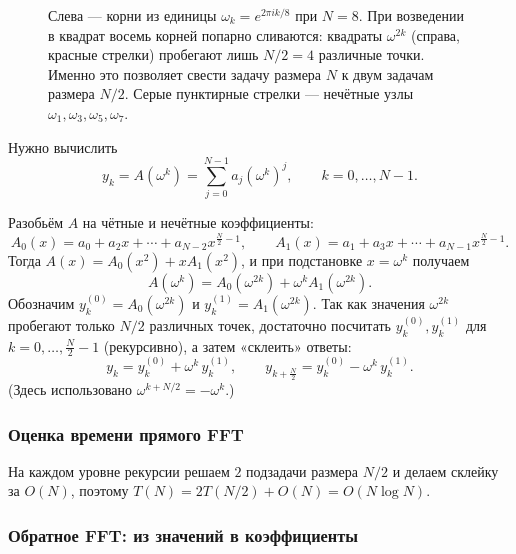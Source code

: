 \begin{figure}[H]
	\caption{Слева — корни из единицы $\omega_k=e^{2\pi ik/8}$ при $N=8$.
		При возведении в квадрат восемь корней попарно сливаются: квадраты
		$\omega^{2k}$ (справа, красные стрелки) пробегают лишь $N/2=4$ различные точки.
		Именно это позволяет свести задачу размера $N$ к двум задачам размера $N/2$.
		Серые пунктирные стрелки — нечётные узлы $\omega_1,\omega_3,\omega_5,\omega_7$.}
	\label{fig:roots}
\end{figure}

Нужно вычислить
\[
y_k = A(\omega^k)=\sum_{j=0}^{N-1} a_j(\omega^k)^j,\qquad k=0,\dots,N-1.
\]

Разобьём $A$ на чётные и нечётные коэффициенты:
\[
A_0(x)=a_0+a_2x+\cdots+a_{N-2}x^{\frac{N}{2}-1},
\qquad
A_1(x)=a_1+a_3x+\cdots+a_{N-1}x^{\frac{N}{2}-1}.
\]
Тогда $A(x)=A_0(x^2)+xA_1(x^2)$, и при подстановке $x=\omega^k$ получаем
\[
A(\omega^k)=A_0(\omega^{2k})+\omega^k A_1(\omega^{2k}).
\]
Обозначим $y_k^{(0)}=A_0(\omega^{2k})$ и $y_k^{(1)}=A_1(\omega^{2k})$.
Так как значения $\omega^{2k}$ пробегают только $N/2$ различных точек,
достаточно посчитать $y_k^{(0)},y_k^{(1)}$ для $k=0,\dots,\frac{N}{2}-1$ (рекурсивно),
а затем «склеить» ответы:
\[
y_k = y_k^{(0)} + \omega^k\, y_k^{(1)},
\qquad
y_{k+\frac{N}{2}} = y_k^{(0)} - \omega^k\, y_k^{(1)}.
\]
(Здесь использовано $\omega^{k+N/2}=-\omega^k$.)

\subsubsection*{Оценка времени прямого FFT}

На каждом уровне рекурсии решаем $2$ подзадачи размера $N/2$
и делаем склейку за $O(N)$, поэтому $T(N)=2T\!\left(N/2\right)+O(N)=O(N\log N)$.

\subsubsection*{Обратное FFT: из значений в коэффициенты}

